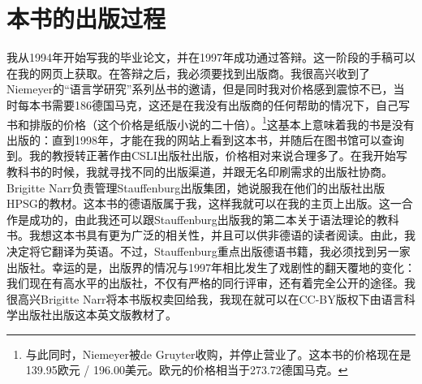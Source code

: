 \section*{本书的出版过程}

我从1994年开始写我的毕业论文，并在1997年成功通过答辩。这一阶段的手稿可以在我的网页上获取。在答辩之后，我必须要找到出版商。我很高兴收到了Niemeyer的“语言学研究”系列丛书的邀请，但是同时我对价格感到震惊不已，当时每本书需要186德国马克，这还是在我没有出版商的任何帮助的情况下，自己写书和排版的价格（这个价格是纸版小说的二十倍）。\footnote{%
与此同时，Niemeyer被de Gruyter收购，并停止营业了。这本书的价格现在是139.95欧元 / 196.00美元。欧元的价格相当于273.72德国马克。
}这基本上意味着我的书是没有出版的：直到1998年，才能在我的网站上看到这本书，并随后在图书馆可以查询到。我的教授转正著作由CSLI出版社出版，价格相对来说合理多了。在我开始写教科书的时候，我就寻找不同的出版渠道，并跟无名印刷需求的出版社协商。Brigitte Narr负责管理Stauffenburg出版集团，她说服我在他们的出版社出版HPSG的教材。这本书的德语版属于我，这样我就可以在我的主页上出版。这一合作是成功的，由此我还可以跟Stauffenburg出版我的第二本关于语法理论的教科书。我想这本书具有更为广泛的相关性，并且可以供非德语的读者阅读。由此，我决定将它翻译为英语。不过，Stauffenburg重点出版德语书籍，我必须找到另一家出版社。幸运的是，出版界的情况与1997年相比发生了戏剧性的翻天覆地的变化：我们现在有高水平的出版社，不仅有严格的同行评审，还有着完全公开的途径。我很高兴Brigitte Narr将本书版权卖回给我，我现在就可以在CC-BY版权下由语言科学出版社出版这本英文版教材了。
